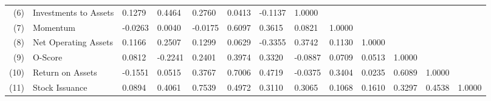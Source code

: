 \documentclass[a4paper]{article}                 %
\begin{document}
\begin{table}[]
{\begin{tabular}{@{}rllllllllllll@{}}
(6) & Investments to Assets & 0.1279 & 0.4464 & 0.2760 & 0.0413 & -0.1137 & 1.0000 &  &  &  &  &  \\
(7) & Momentum & -0.0263 & 0.0040 & -0.0175 & 0.6097 & 0.3615 & 0.0821 & 1.0000 &  &  &  &  \\
(8) & Net Operating Assets & 0.1166 & 0.2507 & 0.1299 & 0.0629 & -0.3355 & 0.3742 & 0.1130 & 1.0000 &  &  &  \\
(9) & O-Score & 0.0812 & -0.2241 & 0.2401 & 0.3974 & 0.3320 & -0.0887 & 0.0709 & 0.0513 & 1.0000 &  &  \\
(10) & Return on Assets & -0.1551 & 0.0515 & 0.3767 & 0.7006 & 0.4719 & -0.0375 & 0.3404 & 0.0235 & 0.6089 & 1.0000 &  \\
(11) & Stock Issuance & 0.0894 & 0.4061 & 0.7539 & 0.4972 & 0.3110 & 0.3065 & 0.1068 & 0.1610 & 0.3297 & 0.4538 & 1.0000 \\ \bottomrule
\end{tabular}%
}
\end{table}


\end{document}
